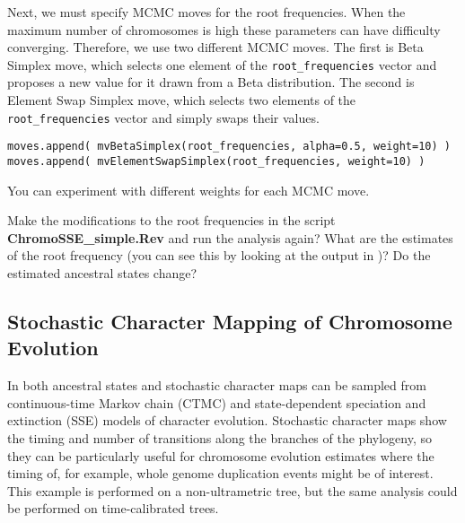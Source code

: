 Next, we must specify MCMC moves for the root frequencies.
When the maximum number of chromosomes is high these parameters
can have difficulty converging.
Therefore, we use two different MCMC moves. The first is Beta Simplex move, which selects one
element of the \texttt{root\_frequencies} vector and proposes
a new value for it drawn from a Beta distribution.
The second is Element Swap Simplex move, which selects two elements
of the \texttt{root\_frequencies} vector and simply swaps their values.
{\tt \begin{snugshade*}
\begin{lstlisting}
moves.append( mvBetaSimplex(root_frequencies, alpha=0.5, weight=10) )
moves.append( mvElementSwapSimplex(root_frequencies, weight=10) )
\end{lstlisting}
\end{snugshade*}}
You can experiment with different weights for each MCMC move.

\impmark Make the modifications to the root frequencies in the script \textbf{ChromoSSE\_simple.Rev} and run the analysis again? What are the estimates of the root frequency (you can see this by looking at the output in \Tracer)? Do the estimated ancestral states change?

\medskip
\subsection{Stochastic Character Mapping of Chromosome Evolution}\label{subsect:stoch_mapping}


In \RevBayes both ancestral states and stochastic character maps can be sampled from
continuous-time Markov chain (CTMC) and state-dependent speciation and
extinction (SSE) models of character evolution.
Stochastic character maps show the timing and number of transitions
along the branches of the phylogeny, so they can be particularly useful
for chromosome evolution estimates where the timing of, for example, whole genome duplication events
might be of interest. This example is performed on a non-ultrametric tree, but
the same analysis could be performed on time-calibrated trees.

\begin{figure}[h!]
\label{fig:simmap}
\end{figure}


